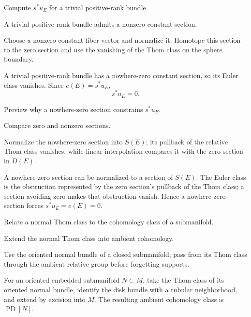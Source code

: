 \begin{exercise}\label{exr:viii31-21}
Compute $s^*u_E$ for a trivial positive-rank bundle.
\end{exercise}
\begin{hint}
A trivial positive-rank bundle admits a nonzero constant section.

Choose a nonzero constant fiber vector and normalize it. Homotope this section to the zero section and use the vanishing of the Thom class on the sphere boundary.
\end{hint}
\begin{solution}
A trivial positive-rank bundle has a nowhere-zero constant section, so its Euler class vanishes. Since \(e(E)=s^*u_E\),
\[
s^*u_E=0.
\]
\end{solution}

\begin{exercise}\label{exr:viii31-22}
Preview why a nowhere-zero section constrains $s^*u_E$.
\end{exercise}
\begin{hint}
Compare zero and nonzero sections.

Normalize the nowhere-zero section into \(S(E)\); its pullback of the relative Thom class vanishes, while linear interpolation compares it with the zero section in \(D(E)\).
\end{hint}
\begin{solution}
A nowhere-zero section can be normalized to a section of \(S(E)\). The Euler class is the obstruction represented by the zero section's pullback of the Thom class; a section avoiding zero makes that obstruction vanish. Hence a nowhere-zero section forces \(s^*u_E=e(E)=0\).
\end{solution}

\begin{exercise}\label{exr:viii31-23}
Relate a normal Thom class to the cohomology class of a submanifold.
\end{exercise}
\begin{hint}
Extend the normal Thom class into ambient cohomology.

Use the oriented normal bundle of a closed submanifold; pass from its Thom class through the ambient relative group before forgetting supports.
\end{hint}
\begin{solution}
For an oriented embedded submanifold \(N\subset M\), take the Thom class of its oriented normal bundle, identify the disk bundle with a tubular neighborhood, and extend by excision into \(M\). The resulting ambient cohomology class is \(\operatorname{PD}[N]\).
\end{solution}

